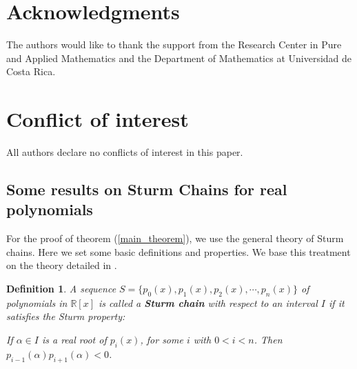 \documentclass[sn-basic]{sn-jnl}%
\theoremstyle{thmstyleone}%
\theoremstyle{thmstyletwo}%
\theoremstyle{thmstylethree}%
\newtheorem{definition}{Definition}%
\newcommand{\bR}{{\mathbb{R}}}      %
\DeclareMathOperator{\Ind}{Ind}
\begin{document}
\section*{Acknowledgments}
The authors would like to thank the support from the Research Center in Pure and Applied Mathematics
and the Department of Mathematics at Universidad de Costa Rica.
\section*{Conflict of interest}
All authors declare no conflicts of interest in this paper.

\begin{appendices}

\section{Some results on Sturm Chains for real polynomials}

For the proof of theorem (\ref{main_theorem}), we use the general theory of Sturm chains. Here we set some basic definitions and properties. We base this treatment on the theory detailed in \cite{Eiser08}.

\begin{definition}
A sequence $ S = \{ p_0(x), p_1(x), p_2(x), \cdots, p_n(x) \}$ of polynomials in $\bR[x]$ is called a \textbf{Sturm chain} with respect to an interval $I$ if it satisfies the Sturm property:

\begin{center}
    If $\alpha \in I$ is a real root of $p_i(x)$, for some $i$ with $0 < i < n$. Then $p_{i-1}(\alpha)p_{i+1}(\alpha) < 0$. 
\end{center}

\end{definition}



\end{appendices}
\end{document}
